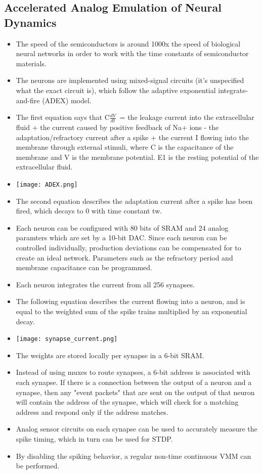 \documentclass[12pt, letterpaper]{article}
\begin{document}
\subsection*{Accelerated Analog Emulation of Neural Dynamics}
\begin{itemize}
    \item The speed of the semiconductors is around 1000x the speed of biological neural networks in order to work with the time constants of semiconductor materials.
    \item The neurons are implemented using mixed-signal circuits (it's unspecified what the exact circuit is), which follow the adaptive exponential integrate-and-fire (ADEX) model.
    \item The first equation says that C\(\frac{dV}{dt}\)\ = the leakage current into the extracellular fluid + the current caused by positive feedback of Na+ ions - the adaptation/refractory current after a spike + the current I flowing into the membrane through external stimuli, where C is the capacitance of the membrane and V is the membrane potential. E1 is the resting potential of the extracellular fluid.
    \item \texttt{[image: ADEX.png]}
    \item The second equation describes the adaptation current after a spike has been fired, which decays to 0 with time constant tw.
    \item Each neuron can be configured with 80 bits of SRAM and 24 analog paramters which are set by a 10-bit DAC. Since each neuron can be controlled individually, production deviations can be compensated for to create an ideal network. Parameters such as the refractory period and membrane capacitance can be programmed.
    \item Each neuron integrates the current from all 256 synapses.
    \item The following equation describes the current flowing into a neuron, and is equal to the weighted sum of the spike trains multiplied by an exponential decay.
    \item \texttt{[image: synapse\_current.png]} 
    \item The weights are stored locally per synapse in a 6-bit SRAM.
    \item Instead of using muxes to route synapses, a 6-bit address is associated with each synapse. If there is a connection between the output of a neuron and a synapse, then any "event packets" that are sent on the output of that neuron will contain the address of the synapse, which will check for a matching address and respond only if the address matches.
    \item Analog sensor circuits on each synapse can be used to accurately measure the spike timing, which in turn can be used for STDP.
    \item By disabling the spiking behavior, a regular non-time continuous VMM can be performed.
\end{itemize}
\end{document}
